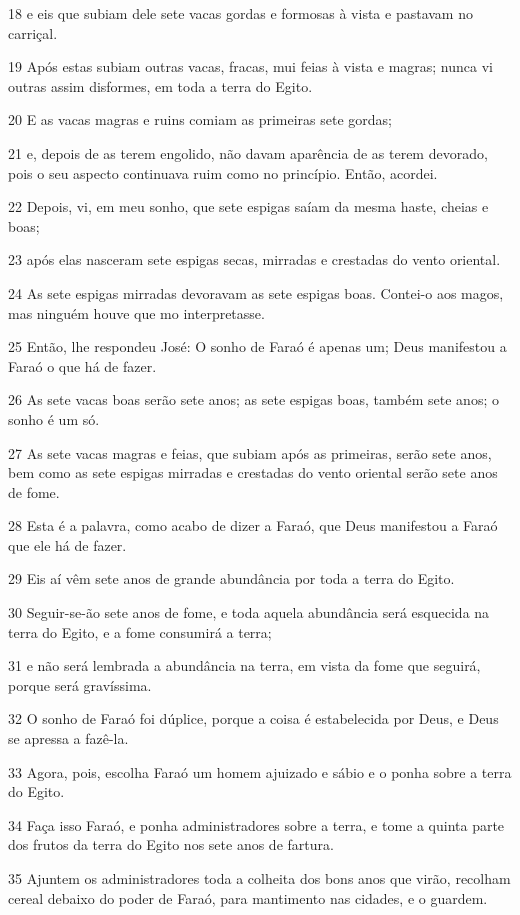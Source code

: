 \par 18 e eis que subiam dele sete vacas gordas e formosas à vista e pastavam no carriçal.
\par 19 Após estas subiam outras vacas, fracas, mui feias à vista e magras; nunca vi outras assim disformes, em toda a terra do Egito.
\par 20 E as vacas magras e ruins comiam as primeiras sete gordas;
\par 21 e, depois de as terem engolido, não davam aparência de as terem devorado, pois o seu aspecto continuava ruim como no princípio. Então, acordei.
\par 22 Depois, vi, em meu sonho, que sete espigas saíam da mesma haste, cheias e boas;
\par 23 após elas nasceram sete espigas secas, mirradas e crestadas do vento oriental.
\par 24 As sete espigas mirradas devoravam as sete espigas boas. Contei-o aos magos, mas ninguém houve que mo interpretasse.
\par 25 Então, lhe respondeu José: O sonho de Faraó é apenas um; Deus manifestou a Faraó o que há de fazer.
\par 26 As sete vacas boas serão sete anos; as sete espigas boas, também sete anos; o sonho é um só.
\par 27 As sete vacas magras e feias, que subiam após as primeiras, serão sete anos, bem como as sete espigas mirradas e crestadas do vento oriental serão sete anos de fome.
\par 28 Esta é a palavra, como acabo de dizer a Faraó, que Deus manifestou a Faraó que ele há de fazer.
\par 29 Eis aí vêm sete anos de grande abundância por toda a terra do Egito.
\par 30 Seguir-se-ão sete anos de fome, e toda aquela abundância será esquecida na terra do Egito, e a fome consumirá a terra;
\par 31 e não será lembrada a abundância na terra, em vista da fome que seguirá, porque será gravíssima.
\par 32 O sonho de Faraó foi dúplice, porque a coisa é estabelecida por Deus, e Deus se apressa a fazê-la.
\par 33 Agora, pois, escolha Faraó um homem ajuizado e sábio e o ponha sobre a terra do Egito.
\par 34 Faça isso Faraó, e ponha administradores sobre a terra, e tome a quinta parte dos frutos da terra do Egito nos sete anos de fartura.
\par 35 Ajuntem os administradores toda a colheita dos bons anos que virão, recolham cereal debaixo do poder de Faraó, para mantimento nas cidades, e o guardem.
